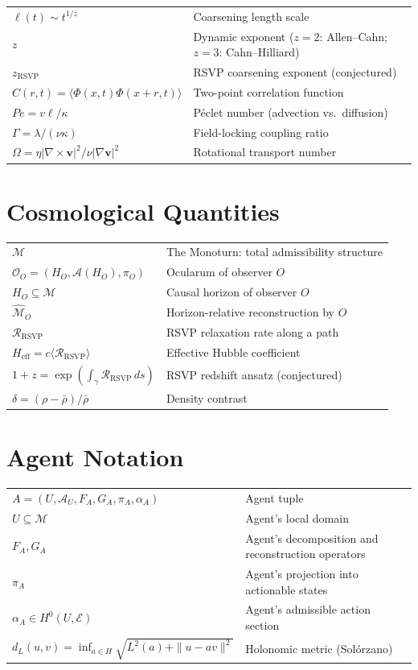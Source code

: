 \begin{tabular}{@{}lp{9cm}}
$\ell(t) \sim t^{1/z}$ & Coarsening length scale \\
$z$ & Dynamic exponent ($z=2$: Allen--Cahn; $z=3$: Cahn--Hilliard) \\
$z_{\mathrm{RSVP}}$ & RSVP coarsening exponent (conjectured) \\
$C(r,t) = \langle \Phi(x,t)\Phi(x+r,t)\rangle$ & Two-point correlation function \\
$Pe = v\ell/\kappa$ & Péclet number (advection vs.\ diffusion) \\
$\Gamma = \lambda/(\nu\kappa)$ & Field-locking coupling ratio \\
$\Omega = \eta|\nabla\times\mathbf{v}|^2 / \nu|\nabla\mathbf{v}|^2$ & Rotational transport number \\
\end{tabular}

\section*{Cosmological Quantities}

\begin{tabular}{@{}lp{9cm}}
$\mathcal{M}$ & The Monoturn: total admissibility structure \\
$\mathcal{O}_O = (H_O, \mathcal{A}(H_O), \pi_O)$ & Ocularum of observer $O$ \\
$H_O \subseteq \mathcal{M}$ & Causal horizon of observer $O$ \\
$\widehat{\mathcal{M}}_O$ & Horizon-relative reconstruction by $O$ \\
$\mathcal{R}_{\mathrm{RSVP}}$ & RSVP relaxation rate along a path \\
$H_{\mathrm{eff}} = c\langle\mathcal{R}_{\mathrm{RSVP}}\rangle$ & Effective Hubble coefficient \\
$1+z = \exp(\int_\gamma \mathcal{R}_{\mathrm{RSVP}}\,ds)$ & RSVP redshift ansatz (conjectured) \\
$\delta = (\rho - \bar\rho)/\bar\rho$ & Density contrast \\
\end{tabular}

\section*{Agent Notation}

\begin{tabular}{@{}lp{9cm}}
$A = (U, \mathcal{A}_U, F_A, G_A, \pi_A, \alpha_A)$ & Agent tuple \\
$U \subseteq \mathcal{M}$ & Agent's local domain \\
$F_A, G_A$ & Agent's decomposition and reconstruction operators \\
$\pi_A$ & Agent's projection into actionable states \\
$\alpha_A \in H^0(U, \mathcal{E})$ & Agent's admissible action section \\
$d_{L}(u,v) = \inf_{a\in H}\sqrt{L^2(a)+\|u-av\|^2}$ & Holonomic metric (Solórzano) \\
\end{tabular}
